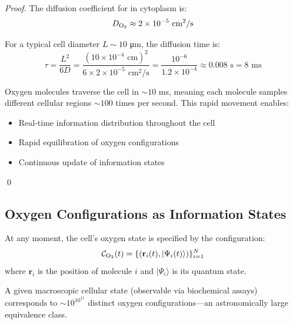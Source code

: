 \begin{proof}
The diffusion coefficient for  in cytoplasm is:
\begin{equation}
D_{\ce{O2}} \approx 2 \times 10^{-5} \text{ cm}^2/\text{s}
\end{equation}

For a typical cell diameter $L \sim 10$ μm, the diffusion time is:
\begin{equation}
\tau = \frac{L^2}{6D} = \frac{(10 \times 10^{-4} \text{ cm})^2}{6 \times 2 \times 10^{-5} \text{ cm}^2/\text{s}} = \frac{10^{-6}}{1.2 \times 10^{-4}} \approx 0.008 \text{ s} = 8 \text{ ms}
\end{equation}

Oxygen molecules traverse the cell in $\sim 10$ ms, meaning each molecule samples different cellular regions $\sim 100$ times per second. This rapid movement enables:
\begin{itemize}
\item Real-time information distribution throughout the cell
\item Rapid equilibration of oxygen configurations
\item Continuous update of information states
\end{itemize}
\qed
\end{proof}

\subsection{Oxygen Configurations as Information States}

\begin{definition}
\label{def:oxygen_configuration}
At any moment, the cell's oxygen state is specified by the configuration:
\begin{equation}
\mathcal{C}_{\ce{O2}}(t) = \{(\mathbf{r}_i(t), |\Psi_i(t)\rangle)\}_{i=1}^{N}
\end{equation}
where $\mathbf{r}_i$ is the position of molecule $i$ and $|\Psi_i\rangle$ is its quantum state.
\end{definition}

\begin{theorem}
\label{thm:config_degeneracy}
A given macroscopic cellular state (observable via biochemical assays) corresponds to $\sim 10^{10^{11}}$ distinct oxygen configurations—an astronomically large equivalence class.
\end{theorem}

